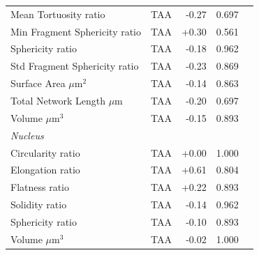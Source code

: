 \documentclass[11pt,a4paper]{article}
\begin{document}
\begin{longtable}{llrrr}
  Mean Tortuosity ratio & TAA & -0.27 & 0.697 &  \\
  Min Fragment Sphericity ratio & TAA & +0.30 & 0.561 &  \\
  Sphericity ratio & TAA & -0.18 & 0.962 &  \\
  Std Fragment Sphericity ratio & TAA & -0.23 & 0.869 &  \\
  Surface Area $\mu$m$^{2}$ & TAA & -0.14 & 0.863 &  \\
  Total Network Length $\mu$m & TAA & -0.20 & 0.697 &  \\
  Volume $\mu$m$^{3}$ & TAA & -0.15 & 0.893 &  \\
\midrule
\multicolumn{5}{l}{\textit{Nucleus}} \\
  Circularity ratio & TAA & +0.00 & 1.000 &  \\
  Elongation ratio & TAA & +0.61 & 0.804 &  \\
  Flatness ratio & TAA & +0.22 & 0.893 &  \\
  Solidity ratio & TAA & -0.14 & 0.962 &  \\
  Sphericity ratio & TAA & -0.10 & 0.893 &  \\
  Volume $\mu$m$^{3}$ & TAA & -0.02 & 1.000 &  \\
\bottomrule
\end{longtable}
\end{document}

